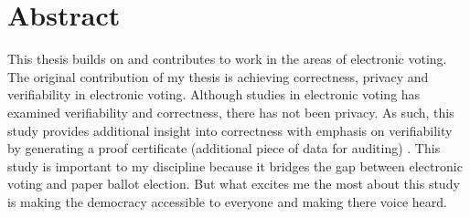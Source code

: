 \chapter*{Abstract}
\vspace{-1em}

This thesis builds on and contributes to work in the areas of electronic voting. 
The original contribution of my thesis is achieving correctness, privacy and verifiability in 
electronic voting. Although studies in electronic voting has examined verifiability and correctness, 
there has not been privacy.   As such, this study provides additional insight into correctness with 
emphasis on verifiability by generating a proof certificate (additional piece of data for auditing) . 
This study is important to my discipline because it bridges the gap between electronic voting 
and paper ballot election. But what excites me the most about this study is making the democracy accessible to everyone
and making there voice heard. 

